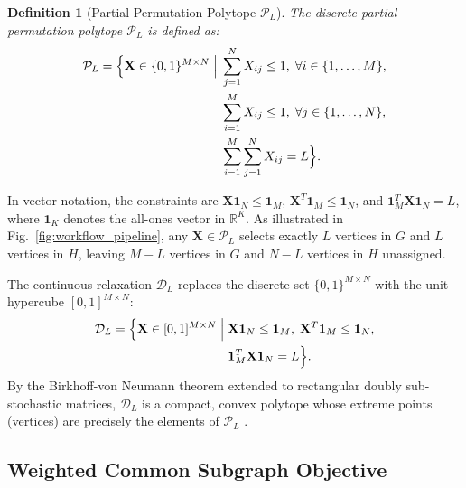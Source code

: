 \documentclass[conference]{IEEEtran}
\newtheorem{definition}{Definition}
\begin{document}
\begin{definition}[Partial Permutation Polytope $\mathcal{P}_L$]
The discrete partial permutation polytope $\mathcal{P}_L$ is defined as:
\begin{align}
\mathcal{P}_L = \Big\{ \mathbf{X} \in \{0, 1\}^{M \times N} \;\Big|\; 
&\sum_{j=1}^N X_{ij} \leq 1, \; \forall i \in \{1, \ldots, M\}, \notag\\
&\sum_{i=1}^M X_{ij} \leq 1, \; \forall j \in \{1, \ldots, N\}, \notag\\
&\sum_{i=1}^M \sum_{j=1}^N X_{ij} = L \Big\}.
\label{eq:polytope_discrete}
\end{align}
\end{definition}

In vector notation, the constraints are $\mathbf{X}\mathbf{1}_N \leq \mathbf{1}_M$, $\mathbf{X}^T\mathbf{1}_M \leq \mathbf{1}_N$, and $\mathbf{1}_M^T\mathbf{X}\mathbf{1}_N = L$, where $\mathbf{1}_K$ denotes the all-ones vector in $\mathbb{R}^K$. As illustrated in Fig.~\ref{fig:workflow_pipeline}, any $\mathbf{X} \in \mathcal{P}_L$ selects exactly $L$ vertices in $G$ and $L$ vertices in $H$, leaving $M - L$ vertices in $G$ and $N - L$ vertices in $H$ unassigned.

The continuous relaxation $\mathcal{D}_L$ replaces the discrete set $\{0, 1\}^{M \times N}$ with the unit hypercube $[0, 1]^{M \times N}$:
\begin{align}
\mathcal{D}_L = \Big\{ \mathbf{X} \in [0, 1]^{M \times N} \;\Big|\; 
&\mathbf{X}\mathbf{1}_N \leq \mathbf{1}_M, \; \mathbf{X}^T\mathbf{1}_M \leq \mathbf{1}_N, \notag\\
&\mathbf{1}_M^T\mathbf{X}\mathbf{1}_N = L \Big\}.
\label{eq:polytope_continuous}
\end{align}
By the Birkhoff-von Neumann theorem extended to rectangular doubly sub-stochastic matrices, $\mathcal{D}_L$ is a compact, convex polytope whose extreme points (vertices) are precisely the elements of $\mathcal{P}_L$ \cite{birkhoff1946}.

\subsection{Weighted Common Subgraph Objective}
\end{document}
